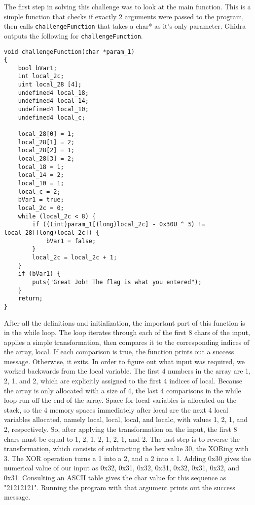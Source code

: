 The first step in solving this challenge was to look at the main function. This is a simple function that checks if exactly 2 arguments were passed to the program, then calls \texttt{challengeFunction} that takes a char* as it's only parameter. Ghidra outputs the following for \texttt{challengeFunction}.

\begin{lstlisting}
void challengeFunction(char *param_1)
{
	bool bVar1;
	int local_2c;
	uint local_28 [4];
	undefined4 local_18;
	undefined4 local_14;
	undefined4 local_10;
	undefined4 local_c;
	
	local_28[0] = 1;
	local_28[1] = 2;
	local_28[2] = 1;
	local_28[3] = 2;
	local_18 = 1;
	local_14 = 2;
	local_10 = 1;
	local_c = 2;
	bVar1 = true;
	local_2c = 0;
	while (local_2c < 8) {
		if (((int)param_1[(long)local_2c] - 0x30U ^ 3) != local_28[(long)local_2c]) {
			bVar1 = false;
		}
		local_2c = local_2c + 1;
	}
	if (bVar1) {
		puts("Great Job! The flag is what you entered");
	}
	return;
}
\end{lstlisting}
After all the definitions and initialization, the important part of this function is in the while loop. The loop iterates through each of the first 8 chars of the input, applies a simple transformation, then compares it to the corresponding indices of the array, local. If each comparison is true, the function prints out a success message. Otherwise, it exits. In order to figure out what input was required, we worked backwards from the local variable. The first 4 numbers in the array are 1, 2, 1, and 2, which are explicitly assigned to the first 4 indices of local. Because the array is only allocated with a size of 4, the last 4 comparisons in the while loop run off the end of the array. Space for local variables is allocated on the stack, so the 4 memory spaces immediately after local are the next 4 local variables allocated, namely local, local, local, and local\textunderscore c, with values 1, 2, 1, and 2, respectively. So, after applying the transformation on the input, the first 8 chars must be equal to 1, 2, 1, 2, 1, 2, 1, and 2. The last step is to reverse the transformation, which consists of subtracting the hex value 30, the XORing with 3. The XOR operation turns a 1 into a 2, and a 2 into a 1. Adding 0x30 gives the numerical value of our input as 0x32, 0x31, 0x32, 0x31, 0x32, 0x31, 0x32, and 0x31. Consulting an ASCII table gives the char value for this sequence as "21212121". Running the program with that argument prints out the success message.
